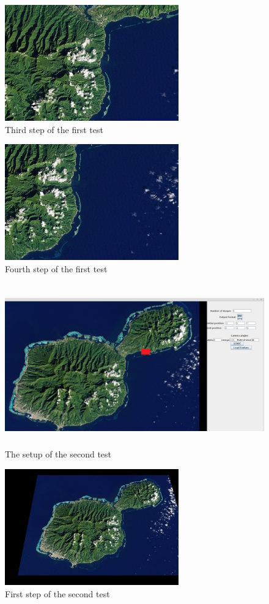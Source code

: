 \documentclass[english,12pt,a4paper,pdftex,elec,utf8]{aaltothesis}
\begin{document}
\begin{figure}[htb]
\centering \includegraphics[height=5cm]{screenshot20.jpg}
\caption{Third step of the first test\label{screenshot2Test1}}
\end{figure}

\begin{figure}[htb]
\centering \includegraphics[height=5cm]{screenshot30.jpg}
\caption{Fourth step of the first test\label{screenshot3Test1}}
\end{figure}

\begin{figure}[htb]
\centering \includegraphics[height=7cm]{screenTest2.png}
\caption{The setup of the second test\label{screenTest2}}
\end{figure}

\begin{figure}[htb]
\centering \includegraphics[height=5cm]{screenshot0.jpg}
\caption{First step of the second test\label{screenshot0Test2}}
\end{figure}
\end{document}
